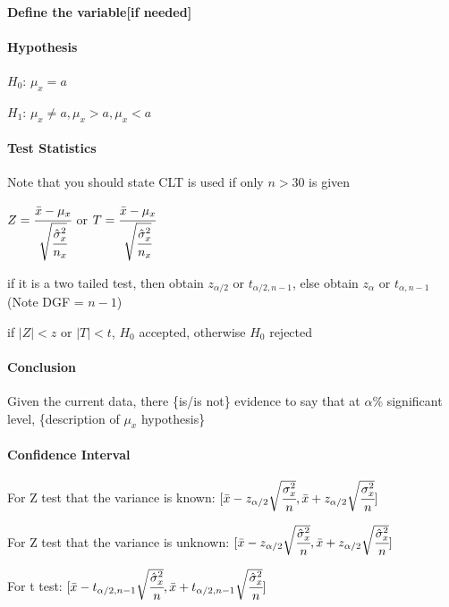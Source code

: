 \documentclass[]{article}
\let\oldparagraph\paragraph
\renewcommand{\paragraph}[1]{\oldparagraph{#1}\mbox{}}
\begin{document}
\paragraph{Define the variable{[}if needed{]}}\label{header-n125}

\paragraph{Hypothesis}\label{header-n126}

\(H_0\): \(\mu_x = a\)

\(H_1\): \(\mu_x \ne a, \mu_x > a, \mu_x < a\)

\paragraph{Test Statistics}\label{header-n129}

Note that you should state CLT is used if only \(n>30\) is given

\(Z = \cfrac{\bar{x} - \mu_x}{\sqrt{\cfrac{\hat{\sigma}^2_x}{n_x}}}\) or
\(T = \cfrac{\bar{x} - \mu_x}{\sqrt{\cfrac{\hat{\sigma}^2_x}{n_x}}}\)

if it is a two tailed test, then obtain \(z_{\alpha/2}\) or
\(t_{\alpha/2 , n-1}\), else obtain \(z_{\alpha}\) or
\(t_{\alpha, n-1}\)(Note DGF = \(n-1\))

if \(|Z| < z\) or \(|T| < t\), \(H_0\) accepted, otherwise \(H_0\)
rejected

\paragraph{Conclusion}\label{header-n133}

Given the current data, there \{is/is not\} evidence to say that at
\(\alpha\)\% significant level, \{description of \(\mu_x\) hypothesis\}

\paragraph{Confidence Interval}\label{header-n135}

For Z test that the variance is known:
\([\bar{x} - z_{\alpha/2}\sqrt{\cfrac{\sigma^2_x}{n}} , \bar{x} + z_{\alpha/2}\sqrt{\cfrac{\sigma^2_x}{n}}]\)

For Z test that the variance is unknown:
\([\bar{x} - z_{\alpha/2}\sqrt{\cfrac{\hat{\sigma}^2_x}{n}},\bar{x} + z_{\alpha/2}\sqrt{\cfrac{\hat{\sigma}^2_x}{n}}]\)

For t test:
\([\bar{x} - t_{\alpha/2,n-1}\sqrt{\cfrac{\hat{\sigma}^2_x}{n}},\bar{x} + t_{\alpha/2,n-1}\sqrt{\cfrac{\hat{\sigma}^2_x}{n}}]\)
\end{document}

